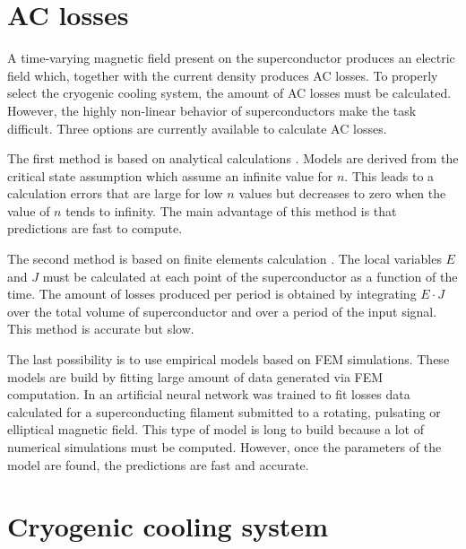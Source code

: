 \documentclass{ws-jmrr}
\begin{document}
\begin{multicols}{2}
\section{AC losses}
\label{ac}
A time-varying magnetic field present on the superconductor produces an electric field which, together with the current density produces AC losses. To properly select the cryogenic cooling system, the amount of AC losses must be calculated. However, the highly non-linear behavior of superconductors make the task difficult. Three options are currently available to calculate AC losses.\par
The first method is based on analytical calculations \cite{0022-3727-3-4-308}. Models are derived from the critical state assumption which assume an infinite value for $n$. This leads to a calculation errors that are large for low $n$ values but decreases to zero when the value of $n$ tends to infinity. The main advantage of this method is that predictions are fast to compute.\par
The second method is based on finite elements calculation \cite{brambilla2006development}. The local variables $E$ and $J$ must be calculated at each point of the superconductor as a function of the time. The amount of losses produced per period is obtained by integrating $E\cdot J$ over the total volume of superconductor and over a period of the input signal. This method is accurate but slow.\par
The last possibility is to use empirical models based on FEM simulations. These models are build by fitting large amount of data generated via FEM computation. In \cite{leclerc2016artificial} an artificial neural network was trained to fit losses data calculated for a superconducting filament submitted to a rotating, pulsating or elliptical magnetic field. This type of model is long to build because a lot of numerical simulations must be computed. However, once the parameters of the model are found, the predictions are fast and accurate.

\section{Cryogenic cooling system}


\end{multicols}
\end{document}
